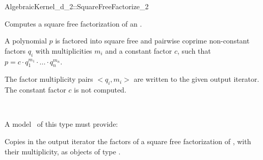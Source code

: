 \begin{ccRefFunctionObjectConcept}{AlgebraicKernel_d_2::SquareFreeFactorize_2}

\ccDefinition
Computes a square free factorization of an
.

A polynomial $p$ is factored into square free and pairwise 
coprime non-constant factors $q_i$ with multiplicities $m_i$ 
and a constant factor $c$, such that 
$p = c  \cdot  q_1^{m_1}  \cdot  ...  \cdot  q_n^{m_n}$.

The factor multiplicity pairs $<q_i,m_i>$ are written to the 
given output iterator. The constant factor $c$ is not computed. 

\ccRefines 
{}\\

\ccOperations
{}

A model \ccVar\ of this type must provide:

{Copies in the output iterator the factors of a square free 
factorization of , with their multiplicity, as objects of type 
.}

\ccSeeAlso
{}\\
\\

\end{ccRefFunctionObjectConcept}
